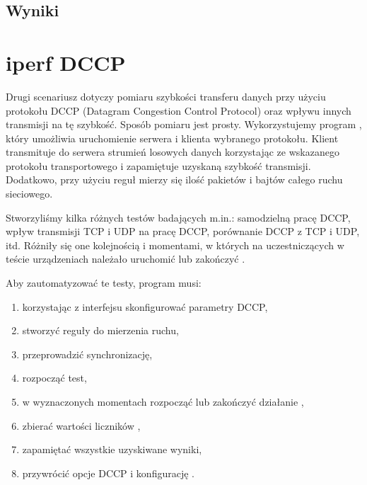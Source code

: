 \documentclass[00-praca-magisterska.tex]{subfiles}
\begin{document}
\subsection{Wyniki}


\section{iperf DCCP}


Drugi scenariusz dotyczy pomiaru szybkości transferu danych przy użyciu
protokołu DCCP (Datagram Congestion Control Protocol) oraz wpływu innych
transmisji na tę szybkość. Sposób pomiaru jest prosty. Wykorzystujemy program
, który umożliwia uruchomienie serwera i klienta wybranego
protokołu. Klient transmituje do serwera strumień losowych danych korzystając
ze wskazanego protokołu transportowego i zapamiętuje uzyskaną szybkość
transmisji. Dodatkowo, przy użyciu reguł  mierzy się ilość
pakietów i bajtów całego ruchu sieciowego.

Stworzyliśmy kilka różnych testów badających m.in.: samodzielną pracę DCCP,
wpływ transmisji TCP i UDP na pracę DCCP, porównanie DCCP z TCP i UDP, itd.
Różniły się one kolejnością i momentami, w których na uczestniczących w teście
urządzeniach należało uruchomić lub zakończyć .

Aby zautomatyzować te testy, program musi:
\begin{enumerate}
\item korzystając z interfejsu  skonfigurować parametry DCCP,
\item stworzyć reguły  do mierzenia ruchu,
\item przeprowadzić synchronizację, 
\item rozpocząć test,
\item w wyznaczonych momentach rozpocząć lub zakończyć działanie ,
\item zbierać wartości liczników ,
\item zapamiętać wszystkie uzyskiwane wyniki,
\item przywrócić opcje DCCP i konfigurację .
\end{enumerate}
\end{document}
